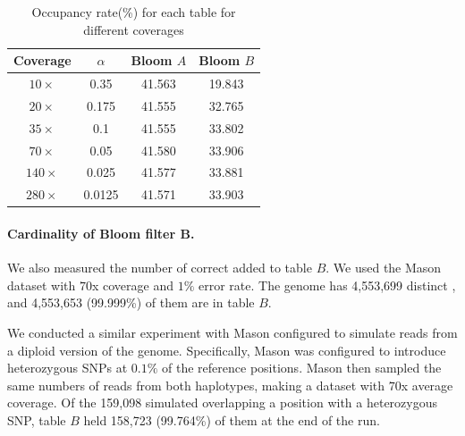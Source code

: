 \documentclass{bmcart}
\begin{document}


\begin{table}
\centering
\begin{tabular}{|c|c|c|c|}\hline
Coverage & $\alpha$ & Bloom $A$ & Bloom $B$ \\ \hline
$10\times$	& 0.35 & 41.563  &	19.843 \\ \hline
$20\times$	& 0.175 & 41.555  &	32.765 \\ \hline
$35\times$ & 0.1 &41.555	& 33.802 \\ \hline
$70\times$ & 0.05 &41.580	& 33.906 \\ \hline
$140\times$ & 0.025 & 41.577 & 33.881  \\ \hline
$280\times$ & 0.0125 & 41.571 & 33.903 \\ \hline
\end{tabular}
\caption{Occupancy rate(\%) for each table for different coverages\label{table:bloom_occupancy_coverage}}
\end{table}

\paragraph{Cardinality of Bloom filter B.}  We also measured the number of correct \kmers added to table $B$. We used the Mason dataset with $70$x coverage and $1\%$ error rate. The \ecoli genome has 4,553,699 distinct \kmers, and 4,553,653 (99.999\%) of them are in table $B$.  

We conducted a similar experiment with Mason configured to simulate reads from a diploid version of the \ecoli genome.  Specifically, Mason was configured to introduce heterozygous SNPs at $0.1\%$ of the reference positions. Mason then sampled the same numbers of reads from both haplotypes, making a dataset with $70$x average coverage.
Of the 159,098 simulated \kmers overlapping a position with a heterozygous SNP, table $B$ held 158,723 (99.764\%) of them at the end of the run.
\end{document}
